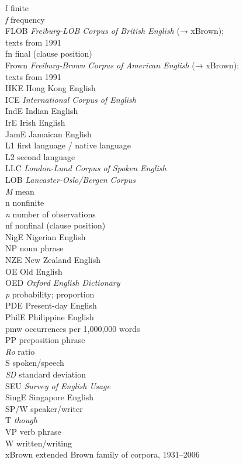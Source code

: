 \begin{tabbing}
f           \> finite\\
\textit{f} \> frequency\\
FLOB       \> \textit{Freiburg-LOB Corpus of {British English}} (→ xBrown);\\ \> texts from 1991\\
fn         \> final (clause position)\\
Frown      \> \textit{Freiburg-Brown Corpus of {American English}} (→ xBrown);\\ \> texts from 1991\\
{HKE}        \> {Hong Kong English}\\
ICE        \> \textit{International Corpus of English}\\
{IndE}       \> {Indian English}\\
{IrE}        \> {Irish English}\\
{JamE}       \> {Jamaican English}\\
L1         \> first language / native language\\
L2         \> second language\\
LLC        \> \textit{London-Lund Corpus of Spoken English}\\
LOB        \> \textit{Lancaster-Oslo/Bergen Corpus}\\
\textit{M} \> mean\\
n          \> nonfinite\\
\textit{n}  \> number of observations\\
nf          \> nonfinal (clause position)\\
{NigE}       \> {Nigerian English}\\
NP         \> noun phrase\\
NZE        \> New Zealand English\\
{OE}         \> {Old English}\\
OED        \> \textit{Oxford English Dictionary}\\
\textit{p} \> probability; proportion\\
PDE        \> Present-day English\\
PhilE        \> Philippine English\\
pmw        \> occurrences per 1,000,000 words\\
PP         \> preposition phrase\\
\textit{Ro} \> ratio\\
S           \> spoken/speech\\
\textit{SD} \> standard deviation\\
SEU        \> \textit{Survey of English Usage}\\
{SingE}      \>  {Singapore English}\\
SP/W       \>  speaker/writer\\
T        \> \textit{though}\\
VP         \> verb phrase\\
W           \>written/writing\\
xBrown     \> extended Brown family of corpora, 1931–2006
\end{tabbing}
